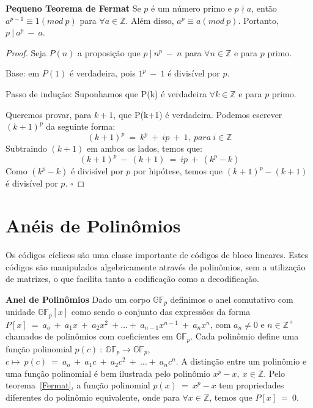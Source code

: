 
\begin{theorem} {\bf Pequeno Teorema de Fermat} \label{Fermat} 
Se $p$ é um número primo e $p \nmid a$, então $a^{p-1} \equiv 1(mod\ p)$ para $\forall a \in \mathbb{Z}$. Além disso, $a^p \equiv a(mod\ p)$.
Portanto, $p\ |\ a^p\ -\ a$. \cite{Rosen:2003}
\end{theorem}

\begin{proof} Seja $P(n)$ a proposição que $p\ |\ n^p\ -\ n$ para $\forall n \in \mathbb{Z}$ e para $p$ primo.

Base: em $P(1)$ é verdadeira, pois $1^p\ -\ 1$ é divisível por $p$.

Passo de indução: Suponhamos que P(k) é verdadeira $\forall k \in \mathbb{Z}$ e para $p$ primo.

Queremos provar, para $k+1$, que P(k+1) é verdadeira. Podemos escrever $(k+1)^p$ da seguinte forma:
$$
(k+1)^p\ =\ k^p\ +\ ip\ +\ 1,\ para\ i \in \mathbb{Z}
$$
Subtraindo $(k+1)$ em ambos os lados, temos que:
$$
(k+1)^p\ -\ (k+1)\ =\ ip\ +\ (k^p-k)
$$
Como $(k^p-k)$ é divisível por $p$ por hipótese, temos que $(k+1)^p - (k+1)$ é divisível por $p$.
$\square$
\end{proof}

\section{Anéis de Polinômios}

Os códigos cíclicos são uma classe importante de códigos de bloco lineares. Estes códigos são manipulados algebricamente através de polinômios, sem a utilização de matrizes, o que facilita tanto a codificação como a decodificação.

\begin{definition} {\bf Anel de Polinômios} \label{AnelPol}  Dado um corpo $\mathbb{GF}_p$ definimos o anel comutativo com unidade $\mathbb{GF}_p[x]$ como sendo o conjunto das expressões da forma $P[x]\ =\ a_o\ +\ a_1x\ +\ a_2x^2\ + \ldots +\ a_{n-1}x^{n-1}\ +\ a_nx^n$, com $a_n \neq 0$ e $n \in \mathbb{Z}^+$ chamados de polinômios com coeficientes em $\mathbb{GF}_p$. Cada polinômio define uma função polinomial $p(c)\ :\ \mathbb{GF}_p \rightarrow \mathbb{GF}_p$, $c \longmapsto\ p(c)\ =\ a_o\ +\ a_1c\ +\ a_2c^2\ +\ \ldots +\ a_nc^n$. A distinção entre um polinômio e uma função polinomial é bem ilustrada pelo polinômio $x^p-x,\ x \in \mathbb{Z}$. Pelo teorema~\ref{Fermat}, a função polinomial $p(x)\ =\ x^p-x$ tem propriedades diferentes do polinômio equivalente, onde para $\forall x \in \mathbb{Z}$, temos que $P[x]\ =\ 0$.
\end{definition}

